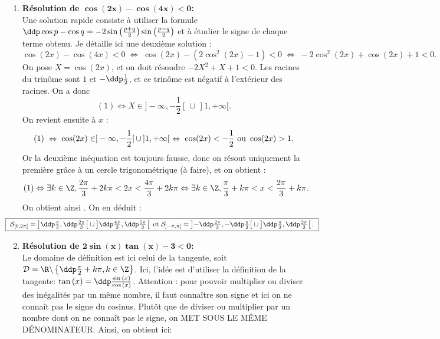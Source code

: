 
\begin{correction}    \;
\begin{enumerate}
\item \textbf{R\'esolution de $\mathbf{ \cos{(2x)}-\cos{(4x)}<0   }$:}\\
Une solution rapide consiste \`a utiliser la formule $\ddp\cos p - \cos q = -2 \sin\left(\frac{p+q}{2}\right)\sin\left(\frac{p-q}{2}\right)$ et \`a \'etudier le signe de chaque terme obtenu. Je d\'etaille ici une deuxi\`eme solution :
$$\cos{(2x)}-\cos{(4x)}<0 \; \Leftrightarrow \; \cos(2x) - (2\cos^2(2x)-1)<0 \; \Leftrightarrow \; -2 \cos^2(2x) + \cos(2x) +1 <0.$$
On pose $X = \cos(2x)$, et on doit r\'esoudre $-2X^2+X+1 <0$. Les racines du trin\^ome sont $1$ et $-\ddp\frac{1}{2}$, et ce trin\^ome est n\'egatif \`a l'ext\'erieur des racines. On a donc 
$$(1) \Leftrightarrow X \in ]-\infty, -\frac{1}{2}[ \, \cup \, ]1, +\infty[.$$
On revient ensuite \`a $x$ :
$$(1) \; \Leftrightarrow \; \cos (2x) \in ]-\infty, -\frac{1}{2}[ \, \cup \, ]1, +\infty[ \; \Leftrightarrow \; \cos (2x) < -\frac{1}{2} \textmd{ ou } \cos (2x) >1.$$ 
Or la deuxi\`eme in\'equation est toujours fausse, donc on r\'esout uniquement la premi\`ere gr\^ace \`a un cercle trigonom\'etrique (\`a faire), et on obtient :
$$(1) \Leftrightarrow \exists k \in \Z, \frac{2\pi}{3} + 2k \pi < 2x <  \frac{4\pi}{3} + 2k \pi \Leftrightarrow \exists k \in \Z, \frac{\pi}{3} + k \pi < x <  \frac{2\pi}{3} + k \pi .$$
On obtient ainsi \fbox{$\ddp \mathcal{S}_\R = \bigcup_{k \in \Z} \left]\frac{\pi}{3} + k \pi, \frac{2\pi}{3} + k \pi \right[$}. On en d\'eduit :
\begin{equation*}
\hspace{-0.9cm} \fbox{
$\mathcal{S}_{\lbrack 0,2\pi\lbrack}=\left\rbrack \ddp\frac{\pi}{3},\ddp\frac{2\pi}{3}  \right\lbrack\cup\left\rbrack \ddp\frac{4\pi}{3},\ddp\frac{5\pi}{3}  \right\lbrack
\ \hbox{et}\ \mathcal{S}_{\rbrack -\pi,\pi\rbrack}=\left\rbrack  -\ddp\frac{2\pi}{3},-\ddp\frac{\pi}{3}  \right\lbrack\cup\left\rbrack  \ddp\frac{\pi}{3},\ddp\frac{2\pi}{3}  \right\lbrack   .$
}
\end{equation*}
\item \textbf{R\'esolution de $\mathbf{2\sin{(x)}\tan{(x)}-3<0  }$:}\\
\noindent Le domaine de d\'efinition est ici celui de la tangente, soit $\mathcal{D} = \R \backslash \left\{ \ddp \frac{\pi}{2} + k\pi, k \in \Z\right\}$. Ici, l'id\'ee est d'utiliser la d\'efinition de la tangente: $\tan{(x)}=\ddp\frac{\sin{(x)}}{\cos{(x)}}$. Attention : pour pouvoir multiplier ou diviser des in\'egalit\'es par un m\^{e}me nombre, il faut conna\^{i}tre son signe et ici on ne conna\^{i}t pas le signe du cosinus. Plut\^{o}t que de diviser ou multiplier par un nombre dont on ne conna\^{i}t pas le signe, on MET SOUS LE M\^EME D\'ENOMINATEUR. Ainsi, on obtient ici:

\end{enumerate}
\end{correction}
